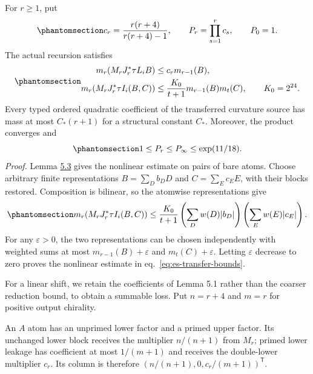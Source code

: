 \documentclass[
  english,
  11pt,
  reqno]{amsart}
\begin{document}
For \(r\ge1\), put
\begin{equation}\protect\phantomsection\label{eq:es-linear-transfer-product}{
 c_r=\frac{r(r+4)}{r(r+4)-1},\qquad
 P_r=\prod_{s=1}^rc_s,
 \qquad P_0=1.
}\end{equation} The actual recursion satisfies
\begin{equation}\protect\phantomsection\label{eq:es-transfer-bounds}{
 \begin{aligned}
 m_r(M_rJ_r^*\tau L_iB)&\le c_rm_{r-1}(B),\\
 m_r(M_rJ_r^*\tau I_i(B,C))
     &\le\frac{K_0}{t+1}m_{r-1}(B)m_t(C),
       \qquad K_0=2^{24}.
 \end{aligned}
}\end{equation} Every typed ordered quadratic coefficient of the
transferred curvature source has mass at most \(C_*(r+1)\) for a
structural constant \(C_*\). Moreover, the product converges and
\begin{equation}\protect\phantomsection\label{eq:es-transfer-product-bound}{
 1\le P_r\le P_\infty\le\exp(11/18).
}\end{equation} \emph{Proof.} Lemma
\hyperref[lem:es-diagram-composition]{5.3} gives the nonlinear estimate
on pairs of bare atoms. Choose arbitrary finite representations
\(B=\sum_Db_DD\) and \(C=\sum_Ec_EE\), with their blocks restored.
Composition is bilinear, so the atomwise representations give
\begin{equation}\protect\phantomsection\label{eq:es-representation-insertion}{
 m_r(M_rJ_r^*\tau I_i(B,C))
 \le\frac{K_0}{t+1}
       \left(\sum_Dw(D)|b_D|\right)
       \left(\sum_Ew(E)|c_E|\right).
}\end{equation} For any \(\varepsilon>0\), the two representations can
be chosen independently with weighted sums at most
\(m_{r-1}(B)+\varepsilon\) and \(m_t(C)+\varepsilon\). Letting
\(\varepsilon\) decrease to zero proves the nonlinear estimate in
eq.~\ref{eq:es-transfer-bounds}.

For a linear shift, we retain the coefficients of Lemma 5.1 rather than
the coarser reduction bound, to obtain a summable loss. Put \(n=r+4\)
and \(m=r\) for positive output chirality.

An \(A\) atom has an unprimed lower factor and a primed upper factor.
Its unchanged lower block receives the multiplier \(n/(n+1)\) from
\(M_r\); primed lower leakage has coefficient at most \(1/(m+1)\) and
receives the double-lower multiplier \(c_r\). Its column is therefore
\((n/(n+1),0,c_r/(m+1))^{\mathsf T}\).
\end{document}
